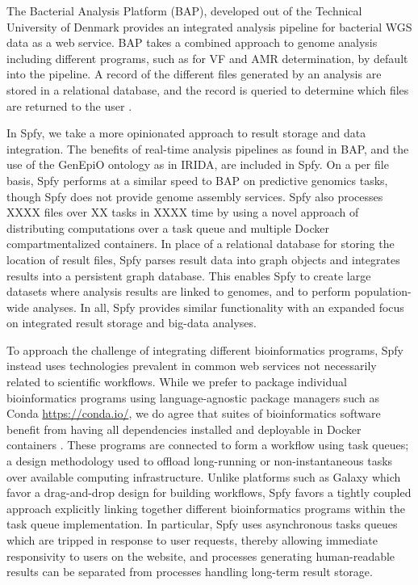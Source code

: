 \documentclass[a4,center,fleqn]{NAR}
\begin{document}
The Bacterial Analysis Platform (BAP), developed out of the Technical University of Denmark provides an integrated analysis pipeline for bacterial WGS data as a web service.
BAP takes a combined approach to genome analysis including different programs, such as for VF and AMR determination, by default into the pipeline.
A record of the different files generated by an analysis are stored in a relational database, and the record is queried to determine which files are returned to the user \cite{thomsen2016bacterial}.

In Spfy, we take a more opinionated approach to result storage and data integration. The benefits of real-time analysis pipelines as found in BAP, and the use of the GenEpiO ontology as in IRIDA, are included in Spfy.
On a per file basis, Spfy performs at a similar speed to BAP on predictive genomics tasks, though Spfy does not provide genome assembly services.
Spfy also processes XXXX files over XX tasks in XXXX time by using a novel approach of distributing computations over a task queue and multiple Docker compartmentalized containers.
In place of a relational database for storing the location of result files, Spfy parses result data into graph objects and integrates results into a persistent graph database.
This enables Spfy to create large datasets where analysis results are linked to genomes, and to perform population-wide analyses. In all, Spfy provides similar functionality with an expanded focus on integrated result storage and big-data analyses.

To approach the challenge of integrating different bioinformatics programs, Spfy instead uses technologies prevalent in common web services not necessarily related to scientific workflows.
While we prefer to package individual bioinformatics programs using language-agnostic package managers such as Conda \url{https://conda.io/}, we do agree that suites of bioinformatics software benefit from having all dependencies installed and deployable in Docker containers \cite{di2015impact}.
These programs are connected to form a workflow using task queues; a design methodology used to offload long-running or non-instantaneous tasks over available computing infrastructure.
Unlike platforms such as Galaxy which favor a drag-and-drop design for building workflows, Spfy favors a tightly coupled approach explicitly linking together different bioinformatics programs within the task queue implementation.
In particular, Spfy uses asynchronous tasks queues which are tripped in response to user requests, thereby allowing immediate responsivity to users on the website, and processes generating human-readable results can be separated from processes handling long-term result storage.
\end{document}
